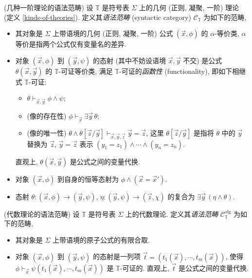\begin{definition}
	[label={first-order-theory-syntactic-category}]
	{(几种一阶理论的语法范畴)}
	设 $\mathbb T$ 是符号表 $\Sigma$ 上的几何 (正则, 凝聚, 一阶) 理论 (定义 \ref{kinds-of-theories}). 定义其\emph{语法范畴} (syntactic category) $\mathcal C_{\mathbb T}$ 为如下的范畴,
	\begin{itemize}
		\item 其对象是 $\Sigma$ 上带语境的几何 (正则, 凝聚, 一阶) 公式 $(\vec x , \phi)$ 的 $\alpha$-等价类, $\alpha$ 等价是指两个公式仅有变量名的差异.
		\item 对象 $(\vec x , \phi)$ 到 $(\vec y , \psi)$ 的态射 (其中不妨设语境 $\vec x , \vec y$ 不交) 是公式 $\theta(\vec x,\vec y)$ 的 $\mathbb T$-可证等价类, 满足 $\mathbb T$-可证的\emph{函数性} (functionality), 即如下相继式 $\mathbb T$-可证:
		\begin{itemize}
			\item $\theta\vdash_{\vec x,\vec y} \phi \wedge \psi$;
			\item (像的存在性) $\phi\vdash_{\vec x} \exists \vec y \,\theta$;
			\item (像的唯一性) $\theta \wedge \theta[\vec z/\vec y] \vdash_{\vec x,\vec y,\vec z} \vec y = \vec z$, 这里 $\theta[\vec z / \vec y]$ 是指将 $\theta$ 中的 $\vec y$ 替换为 $\vec z$, $\vec y = \vec z$ 表示 $(y_1=z_1)\land \cdots\land (y_n=z_n)$.
		\end{itemize}
		直观上, $\theta(\vec x,\vec y)$ 是公式之间的变量代换.
		\item 对象 $(\vec x,\phi)$ 到自身的恒等态射为 $\phi\land (\vec x = \vec x')$.
		\item 态射 $\theta\colon (\vec x,\phi) \to (\vec y,\psi)$, $\eta\colon (\vec y,\psi) \to (\vec z,\chi)$ 的复合为
		$
		\exists\vec y\,(\eta\land\theta)
		$.
	\end{itemize}
\end{definition}

\begin{definition}
	{(代数理论的语法范畴)}
	设 $\mathbb T$ 是符号表 $\Sigma$ 上的代数理论. 定义其\emph{语法范畴} $\mathcal C_{\mathbb T}^{\text{alg}}$ 为如下的范畴,
	\begin{itemize}
		\item 其对象是 $\Sigma$ 上带语境的原子公式的有限合取.
		\item 对象 $(\vec x , \phi)$ 到 $(\vec y , \psi)$ 的态射是一列项 $\vec t = (t_1(\vec x),\cdots,t_m(\vec x))$, 使得 $\phi\vdash_{\vec x} \psi(t_1(\vec x),\cdots,t_m(\vec x))$ 是 $\mathbb T$-可证的. 直观上, $\vec t$ 是公式之间的变量代换.
	\end{itemize}
\end{definition}


